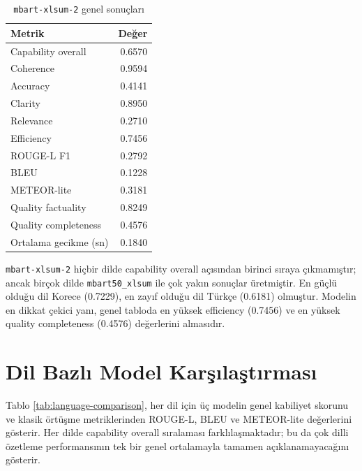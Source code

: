 \documentclass[12pt,a4paper]{article}
\begin{document}
\begin{table}[H]
\centering
\caption{\texttt{mbart-xlsum-2} genel sonuçları}
\begin{tabular}{lr}
\toprule
Metrik & Değer \\
\midrule
Capability overall & 0.6570 \\
Coherence & 0.9594 \\
Accuracy & 0.4141 \\
Clarity & 0.8950 \\
Relevance & 0.2710 \\
Efficiency & 0.7456 \\
ROUGE-L F1 & 0.2792 \\
BLEU & 0.1228 \\
METEOR-lite & 0.3181 \\
Quality factuality & 0.8249 \\
Quality completeness & 0.4576 \\
Ortalama gecikme (sn) & 0.1840 \\
\bottomrule
\end{tabular}
\end{table}

\texttt{mbart-xlsum-2} hiçbir dilde capability overall açısından birinci sıraya çıkmamıştır; ancak birçok dilde \texttt{mbart50\_xlsum} ile çok yakın sonuçlar üretmiştir. En güçlü olduğu dil Korece (0.7229), en zayıf olduğu dil Türkçe (0.6181) olmuştur. Modelin en dikkat çekici yanı, genel tabloda en yüksek efficiency (0.7456) ve en yüksek quality completeness (0.4576) değerlerini almasıdır.

\section{Dil Bazlı Model Karşılaştırması}

Tablo \ref{tab:language-comparison}, her dil için üç modelin genel kabiliyet skorunu ve klasik örtüşme metriklerinden ROUGE-L, BLEU ve METEOR-lite değerlerini gösterir. Her dilde capability overall sıralaması farklılaşmaktadır; bu da çok dilli özetleme performansının tek bir genel ortalamayla tamamen açıklanamayacağını gösterir.
\end{document}
